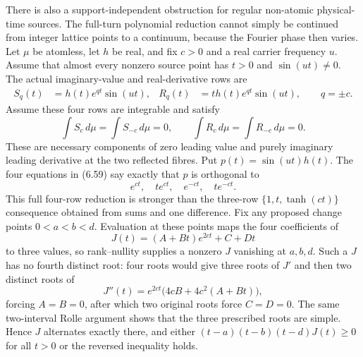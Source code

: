 \documentclass[11pt]{article}
\theoremstyle{definition}
\theoremstyle{remark}
\begin{document}
There is also a support-independent obstruction for regular non-atomic physical-time sources.
The full-turn polynomial reduction cannot simply be continued from integer lattice points to a
continuum, because the Fourier phase then varies.  Let $\mu$ be atomless, let $h$ be real, and
fix $c>0$ and a real carrier frequency $u$.  Assume that almost every nonzero source point has
$t>0$ and $\sin(ut)\ne0$.  The actual imaginary-value and real-derivative rows are
\[
\begin{aligned}
 S_q(t)&=h(t)e^{qt}\sin(ut),&
 R_q(t)&=t h(t)e^{qt}\sin(ut),\qquad q=\pm c .
\end{aligned}                                           \tag{6.58}
\]
Assume these four rows are integrable and satisfy
\[
 \int S_c\,d\mu=\int S_{-c}\,d\mu=0,\qquad
 \int R_c\,d\mu=\int R_{-c}\,d\mu=0.                    \tag{6.59}
\]
These are necessary components of zero leading value and purely imaginary leading derivative at
the two reflected fibres.  Put $p(t)=\sin(ut)h(t)$.  The four equations in (6.59) say exactly
that $p$ is orthogonal to
\[
 e^{ct},\quad te^{ct},\quad e^{-ct},\quad te^{-ct}.     \tag{6.60}
\]
This full four-row reduction is stronger than the three-row
$\{1,t,\tanh(ct)\}$ consequence obtained from sums and one difference.  Fix any proposed change
points $0<a<b<d$.  Evaluation at these points maps the four coefficients of
\[
 J(t)=(A+Bt)e^{2ct}+C+Dt
\]
to three values, so rank--nullity supplies a nonzero $J$ vanishing at $a,b,d$.  Such a $J$ has no
fourth distinct root: four roots would give three roots of $J'$ and then two distinct roots of
\[
 J''(t)=e^{2ct}\bigl(4cB+4c^2(A+Bt)\bigr),
\]
forcing $A=B=0$, after which two original roots force $C=D=0$.  The same two-interval Rolle
argument shows that the three prescribed roots are simple.  Hence $J$ alternates exactly there,
and either $(t-a)(t-b)(t-d)J(t)\geq0$ for all $t>0$ or the reversed inequality holds.
\end{document}
